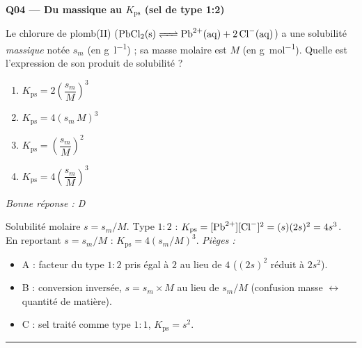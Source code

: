 \documentclass[11pt,a4paper]{article}
\begin{document}
\noindent\textbf{Q04 --- Du massique au $K_{\mathrm{ps}}$ (sel de type 1:2)}\par
Le chlorure de plomb(II)  ($\ce{PbCl2(s) <=> Pb^{2+}(aq) + 2 Cl^{-}(aq)}$) a une solubilité
\emph{massique} notée $s_m$ (en \si{\gram\per\litre}) ; sa masse molaire est $M$ (en \si{\gram\per\mole}).
Quelle est l'expression de son produit de solubilité ?
\begin{enumerate}[label=\Alph*)]
\item $K_{\mathrm{ps}} = 2\left(\dfrac{s_m}{M}\right)^{3}$
\item $K_{\mathrm{ps}} = 4\left(s_m\,M\right)^{3}$
\item $K_{\mathrm{ps}} = \left(\dfrac{s_m}{M}\right)^{2}$
\item $K_{\mathrm{ps}} = 4\left(\dfrac{s_m}{M}\right)^{3}$
\end{enumerate}
\textit{Bonne réponse : D}\par
Solubilité molaire $s = s_m/M$. Type $1{:}2$ : $K_{\mathrm{ps}} = [\ce{Pb^{2+}}][\ce{Cl-}]^{2} = (s)(2s)^{2} = 4s^{3}$.
En reportant $s = s_m/M$ : $K_{\mathrm{ps}} = 4\left(s_m/M\right)^{3}$.
\textit{Pièges :}
\begin{itemize}
\item A : facteur du type $1{:}2$ pris égal à $2$ au lieu de $4$ ($(2s)^{2}$ réduit à $2s^{2}$).
\item B : conversion inversée, $s = s_m\times M$ au lieu de $s_m/M$ (confusion masse $\leftrightarrow$ quantité de matière).
\item C : sel traité comme type $1{:}1$, $K_{\mathrm{ps}} = s^{2}$.
\end{itemize}
\vspace{6pt}\hrule\vspace{8pt}
\end{document}
